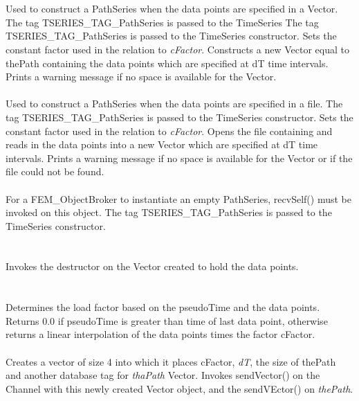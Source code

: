  \\ 
\\ 
Used to construct a PathSeries when the data points are specified in a
Vector. The tag TSERIES\_TAG\_PathSeries is passed to the TimeSeries
The tag TSERIES\_TAG\_PathSeries is passed to the TimeSeries
constructor. Sets the constant factor used in the relation to {\em
cFactor}. Constructs a new Vector equal to \p thePath containing the
data points which are specified at \p dT time intervals. Prints a
warning message if no space is available for the Vector.\\

\\ 
Used to construct a PathSeries when the data points are specified in a
file. The tag TSERIES\_TAG\_PathSeries is passed to the TimeSeries
constructor. Sets the constant factor used in the relation to {\em
cFactor}. Opens the file containing and reads in the data points into
a new Vector which are specified at \p dT time intervals. Prints a
warning message if no space is available for the Vector or if the file
could not be found.\\


\\ 
For a FEM\_ObjectBroker to instantiate an empty PathSeries, recvSelf()
must be invoked on this object. The tag TSERIES\_TAG\_PathSeries is
passed to the TimeSeries constructor. \\


 \\
\\ 
Invokes the destructor on the Vector created to hold the data
points. \\


 \\
\\
Determines the load factor based on the \p pseudoTime and the data
points. Returns $0.0$ if \p pseudoTime is greater than time of last
data point, otherwise returns a linear interpolation of the data
points times the factor \p cFactor. \\

\\
Creates a vector of size 4 into which it places \p cFactor, {\em
dT}, the size of \p thePath and another database tag for {\em
thaPath} Vector.  Invokes sendVector() on the Channel with this
newly created Vector object, and the sendVEctor() on {\em
thePath}. \\

